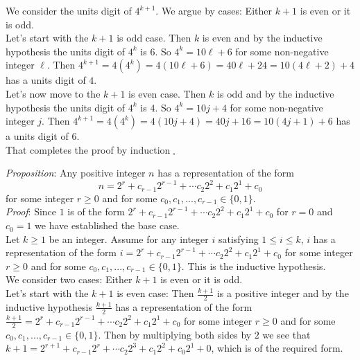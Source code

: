 \documentclass[12pt]{amsart}
\theoremstyle{definition}
\theoremstyle{remark}
\begin{document}
We consider the units digit of $4^{k+1}$.  We argue by cases:  Either $k+1$ is even or it is odd.  \\

Let's start with the $k+1$ is odd case.   Then $k$ is even and by the inductive hypothesis the units digit of $4^k$ is $6$.  So $4^k=10\ell +6$ for some non-negative integer $\ell$.  Then $4^{k+1}=4(4^k)=4(10\ell+6)=40\ell+24=10(4\ell+2)+4$ has a units digit of $4$.\\


Let's now move to the $k+1$ is even case. Then $k$ is odd and by the inductive hypothesis the units digit of $4^k$ is $4$.  So $4^k=10j+4$ for some non-negative integer $j$.  Then $4^{k+1}=4(4^k)=4(10j+4)=40j+16=10(4j+1)+6$ has a units digit of $6$.  \\

That completes the proof by induction$\;_{\square}$

\newpage


\emph{Proposition}:  Any positive integer $n$ has a representation of the form $$n=2^r+c_{r-1}2^{r-1}+\cdots c_2 2^2+c_1 2^1+c_0$$ for some integer $r\geq 0$ and for some $c_0,c_1,...,c_{r-1}\in\{0,1\}$.\\

\emph{Proof}:  Since $1$ is of the form $2^r+c_{r-1}2^{r-1}+\cdots c_2 2^2+c_1 2^1+c_0$ for $r=0$ and $c_0=1$ we have established the base case.\\

Let $k\geq 1$ be an integer.  Assume for any integer $i$ satisfying $1\leq i\leq k$, $i$ has a representation of the form $i= 2^r+c_{r-1}2^{r-1}+\cdots c_2 2^2+c_1 2^1+c_0$ for some integer $r\geq 0$ and for some $c_0,c_1,...,c_{r-1}\in\{0,1\}$.  This is the inductive hypothesis.\\

We consider two cases:  Either $k+1$ is even or it is odd.\\

Let's start with the $k+1$ is even case:  Then $\displaystyle \frac{k+1}{2}$ is a positive integer and by the inductive hypothesis $\displaystyle \frac{k+1}{2}$ has a representation of the form $\displaystyle \frac{k+1}{2}=2^r+c_{r-1}2^{r-1}+\cdots c_2 2^2+c_1 2^1+c_0$ for some integer $r\geq 0$ and for some $c_0,c_1,...,c_{r-1}\in\{0,1\}$.  Then by multiplying both sides by $2$ we see that $k+1=2^{r+1}+c_{r-1}2^{r}+\cdots c_2 2^3+c_1 2^2+c_0 2^1+0$, which is of the required form.\\
\end{document}
